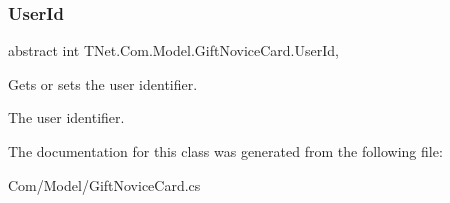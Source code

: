 \subsubsection{\texorpdfstring{User\+Id}{UserId}}
{\footnotesize\ttfamily abstract int T\+Net.\+Com.\+Model.\+Gift\+Novice\+Card.\+User\+Id\hspace{0.3cm}{\ttfamily [get]}, {\ttfamily [set]}}



Gets or sets the user identifier. 

The user identifier.

The documentation for this class was generated from the following file\+:\begin{DoxyCompactItemize}
\item 
Com/\+Model/Gift\+Novice\+Card.\+cs\end{DoxyCompactItemize}
